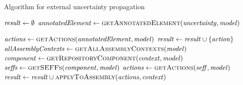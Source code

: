 \begin{algorithm}
    \caption{Algorithm for external uncertainty propagation}
    \label{alg:impactanalysis:external}
    \begin{algorithmic}[1]
        \algindentskip
        \State $\mathit{result} \gets \emptyset$
        \State $\mathit{annotatedElement} \gets \textsc{getAnnotatedElement}(\mathit{uncertainty}, \mathit{model})$
        \algblockskip

         \label{alg:impactanalysis:external:4}
                \State $\mathit{actions} \gets \textsc{getActions}(\mathit{annotatedElement}, \mathit{model})$ \label{alg:impactanalysis:external:6}
                 
                        \State $\mathit{result} \gets \mathit{result} \cup \{ \mathit{action} \}$
                    \EndIf
                \EndFor
                \algblockskip
            \EndCase
                \State $\mathit{allAssemblyContexts} \gets \textsc{getAllAssemblyContexts}(\mathit{model})$ \label{alg:impactanalysis:external:13}
                 
                     \label{alg:impactanalysis:external:15}
                        \State $\mathit{component} \gets \textsc{getRepositoryComponent}(\mathit{context}, \mathit{model})$
                        \State $\mathit{seffs} \gets \textsc{getSEFFs}(\mathit{component}, \mathit{model})$
                            \State $\mathit{actions} \gets \textsc{getActions}(\mathit{seff}, \mathit{model})$ 
                            \State $\mathit{result} \gets \mathit{result} \cup \textsc{applyToAssembly}(\mathit{actions},\mathit{context})$ \label{alg:impactanalysis:external:20}
                        \EndFor
                    \EndIf
                \EndFor
            \EndCase
        \EndSwitch
        \algblockskip
        \State {}
        \algindentskip
        \EndProcedure   
    \end{algorithmic}
\end{algorithm}

